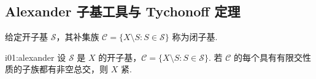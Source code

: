 \subsection{Alexander 子基工具与 Tychonoff 定理}

给定开子基 \(\displaystyle \mathcal S\)，其补集族 \(\displaystyle \mathcal C=\{X\setminus S:S\in\mathcal S\}\)
称为闭子基.

\begin{FALemma}{i01:alexander}
设 \(\displaystyle \mathcal S\) 是 \(\displaystyle X\) 的开子基，\(\displaystyle \mathcal C=\{X\setminus S:S\in\mathcal S\}\). 若 \(\displaystyle \mathcal C\) 的每个具有有限交性质的子族都有非空总交，则 \(\displaystyle X\) 紧.
\end{FALemma}

